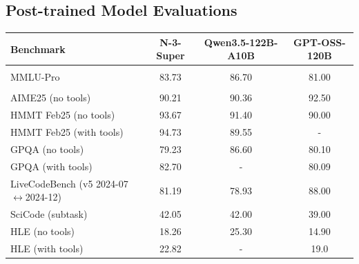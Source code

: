 \subsection{Post-trained Model Evaluations}
\label{subsec:final_model_evals}


\begin{table}[!htp]
\centering
\small
\setlength{\tabcolsep}{7pt}
\renewcommand{\arraystretch}{1.15}
\begin{tabular}{l|c c c}
\toprule
\textbf{Benchmark} & \textbf{N-3-Super} & \textbf{Qwen3.5-122B-A10B} & \textbf{GPT-OSS-120B} \\
\midrule

\rowcolor{black!5}
\multicolumn{4}{l}{\textbf{General Knowledge}} \\
MMLU-Pro & 83.73 & 86.70 & 81.00 \\

\midrule
\rowcolor{black!5}
\multicolumn{4}{l}{\textbf{Reasoning}} \\
AIME25 (no tools) & 90.21 & 90.36 & 92.50  \\
HMMT Feb25 (no tools) & 93.67 & 91.40 & 90.00  \\
HMMT Feb25 (with tools) & 94.73 & 89.55 & -  \\
GPQA (no tools) & 79.23 & 86.60 & 80.10 \\
GPQA (with tools) & 82.70 & - & 80.09 \\
LiveCodeBench (v5 2024-07$\leftrightarrow$2024-12) & 81.19 & 78.93 & 88.00 \\
SciCode (subtask) & 42.05 & 42.00 & 39.00  \\
HLE (no tools) & 18.26 & 25.30 & 14.90  \\
HLE (with tools) & 22.82 & - & 19.0 \\


\end{tabular}
\end{table}
